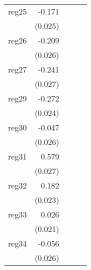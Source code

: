 {\begin{longtable}{l*{4}{D{.}{.}{-1}}}
\addlinespace
reg25       &      -0.171\sym{***}&                     &                     &                     \\
            &     (0.025)         &                     &                     &                     \\
\addlinespace
reg26       &      -0.209\sym{***}&                     &                     &                     \\
            &     (0.026)         &                     &                     &                     \\
\addlinespace
reg27       &      -0.241\sym{***}&                     &                     &                     \\
            &     (0.027)         &                     &                     &                     \\
\addlinespace
reg29       &      -0.272\sym{***}&                     &                     &                     \\
            &     (0.024)         &                     &                     &                     \\
\addlinespace
reg30       &      -0.047         &                     &                     &                     \\
            &     (0.026)         &                     &                     &                     \\
\addlinespace
reg31       &       0.579\sym{***}&                     &                     &                     \\
            &     (0.027)         &                     &                     &                     \\
\addlinespace
reg32       &       0.182\sym{***}&                     &                     &                     \\
            &     (0.023)         &                     &                     &                     \\
\addlinespace
reg33       &       0.026         &                     &                     &                     \\
            &     (0.021)         &                     &                     &                     \\
\addlinespace
reg34       &      -0.056\sym{*}  &                     &                     &                     \\
            &     (0.026)         &                     &                     &                     \\

\end{longtable}}
